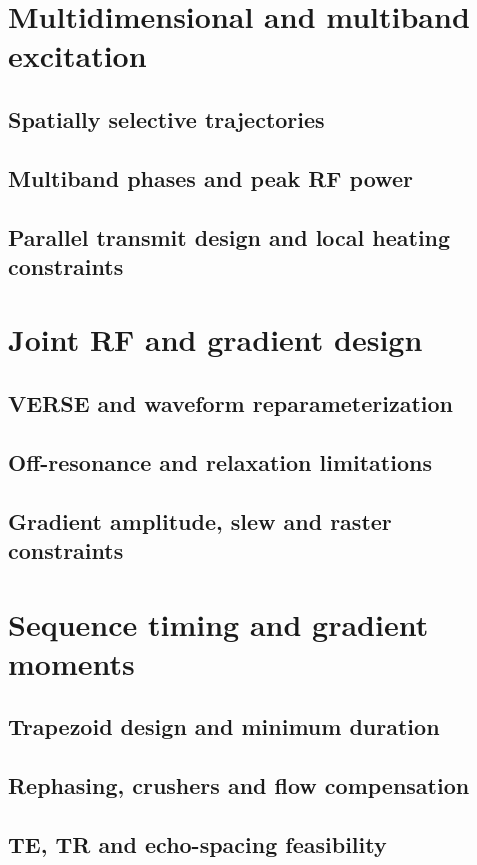 \section{Multidimensional and multiband excitation}
\label{sec:18:multidimensional-and-multiband-excitation}
\subsection{Spatially selective trajectories}
\subsection{Multiband phases and peak RF power}
\subsection{Parallel transmit design and local heating constraints}

\section{Joint RF and gradient design}
\label{sec:18:joint-rf-and-gradient-design}
\subsection{VERSE and waveform reparameterization}
\subsection{Off-resonance and relaxation limitations}
\subsection{Gradient amplitude, slew and raster constraints}

\section{Sequence timing and gradient moments}
\label{sec:18:sequence-timing-and-gradient-moments}
\subsection{Trapezoid design and minimum duration}
\subsection{Rephasing, crushers and flow compensation}
\subsection{TE, TR and echo-spacing feasibility}

